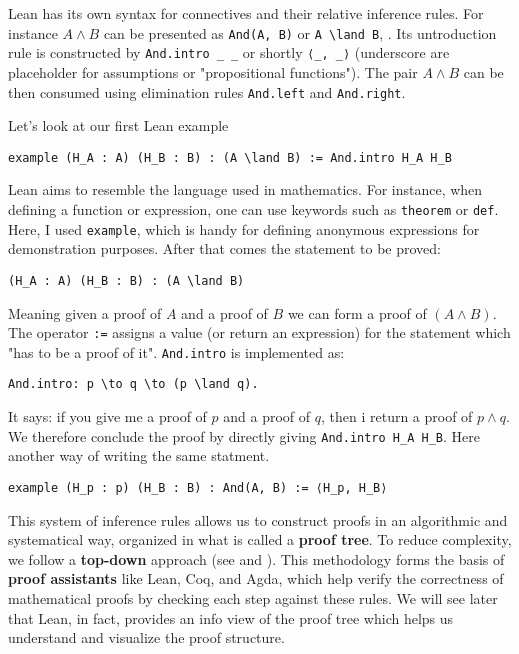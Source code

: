 Lean has its own syntax for connectives and their relative inference rules.
For instance $A \land B$ can be presented as \lstinline[language=lean]|And(A, B)| or \lstinline[language=lean]|A \land B|,
. Its untroduction rule is constructed by
\lstinline[language=lean]|And.intro _ _| or shortly
\lstinline[language=lean]|⟨_, _⟩| (underscore are placeholder for assumptions or "propositional functions").
The pair $A \land B$ can be then consumed using elimination
rules \lstinline[language=lean]|And.left| and \lstinline[language=lean]|And.right|.
\begin{example}\label{ex:conj_intro_2}
  Let's look at our first Lean example
  \begin{lstlisting}[language=lean]
    example (H_A : A) (H_B : B) : (A \land B) := And.intro H_A H_B
  \end{lstlisting}
  Lean aims to resemble the language used in mathematics.
  For instance, when defining a function or expression, one can use keywords such as
  \lstinline[language=lean]|theorem| or \lstinline[language=lean]|def|.
  Here, I used \lstinline[language=lean]|example|, which is handy for defining anonymous expressions
  for demonstration purposes.
  After that comes the statement to be proved:
  \begin{lstlisting}[language=lean]
  (H_A : A) (H_B : B) : (A \land B) 
\end{lstlisting}
  Meaning given a proof of $A$ and a proof of $B$ we can form a proof of $(A \land B)$.
  The operator \lstinline[language=lean]|:=| assigns a value (or return an expression) for the statement which
  "has to be a proof of it".
  \lstinline[language=lean]|And.intro| is implemented as:
  \begin{lstlisting}[language=lean]
  And.intro: p \to q \to (p \land q).
\end{lstlisting}
  It says: if you give me a proof of $p$ and a proof of $q$,
  then i return a proof of $p \land q$.
  We therefore conclude the proof by directly giving
  \lstinline[language=lean]|And.intro H_A H_B|.
  Here another way of writing the same statment.
  \begin{lstlisting}[language=lean]
  example (H_p : p) (H_B : B) : And(A, B) := ⟨H_p, H_B⟩
\end{lstlisting}
\end{example}

This system of inference rules allows us to construct proofs in an
algorithmic and systematical way, organized in what is called a \textbf{proof tree}.
To reduce complexity, we follow a
\textbf{top-down} approach (see \cite{thompson1999types} and
\cite{nordstrom1990programming}).
This methodology forms the basis of \textbf{proof assistants} like Lean,
Coq, and Agda, which help
verify the correctness of mathematical proofs by checking each step
against these rules.
We will see later that Lean, in fact, provides an info view of the proof tree
which helps us
understand and visualize
the proof structure.


